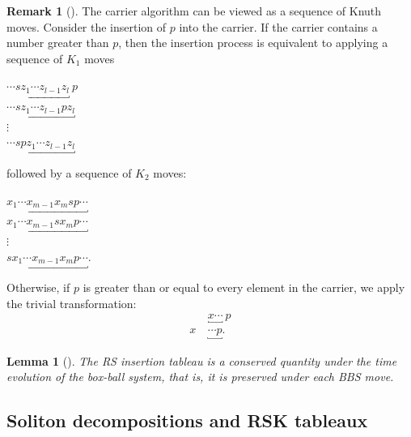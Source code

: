 \documentclass[submission]{FPSAC2021}
\theoremstyle{plain}
\newtheorem{lemma}[theorem]{Lemma}
\theoremstyle{definition}
\newtheorem{remark}[theorem]{Remark}
\numberwithin{equation}{section}
\begin{document}
    
    \begin{remark}[{\cite[Remark 4]{fukuda04}}]\label{rmk: carrier is knuth}
        The carrier algorithm can be viewed as a sequence of Knuth moves.  
        Consider the insertion of $p$ into the carrier. 
         If the carrier contains a number greater than $p$, then the insertion process is equivalent to applying a sequence of $K_1$ moves
        \begin{center}
            $\underbracket{\cdots s z_1\cdots z_{l-1}z_l} \: p$ \\
            $\underbracket{\cdots s z_1\cdots z_{l-1} p z_l}$ \\%
            $\vdots$ \\%
            $\underbracket{\cdots s pz_1\cdots z_{l-1}z_l}$
        \end{center}
        followed by a sequence of $K_2$ moves:
        \begin{center}
         $\underbracket{x_1\cdots x_{m-1}x_m s p\cdots}$ \\[2mm]
            $\underbracket{x_1\cdots x_{m-1}s x_mp\cdots}$ \\%
            
            $\vdots$ \\%
            $s \underbracket{x_1\cdots x_{m-1}x_mp\cdots}.$
        \end{center}
        Otherwise, if $p$ is greater than or equal to every element in the carrier, we apply the trivial transformation:
        \vspace{-5mm}
           \begin{align*} &\underbracket{x\cdots}\: p \\
          x\:&\underbracket{\cdots p}.
        \end{align*}
    \end{remark}
    
    \begin{lemma}
    [{\cite[Theorem 3.1]{fukuda04}}]
    \label{lemma:preserved}
    The RS insertion tableau is a conserved quantity under the time evolution of the box-ball system, that is, it is preserved under each BBS move.
    \end{lemma}
    
    
    \subsection{Soliton decompositions and RSK tableaux}
\end{document}
